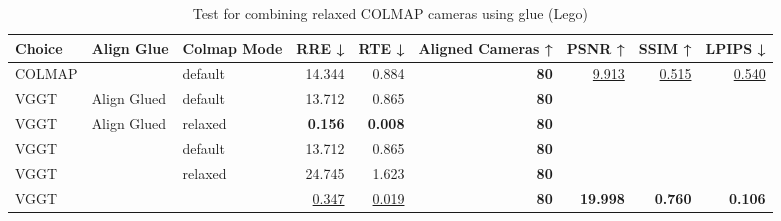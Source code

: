 \begin{table}[H]
\caption{Test for combining relaxed COLMAP cameras using glue (Lego)}
\label{tab:99_align_glue_relaxed_lego}
\begin{tabular}{lllrrrrrr}
\toprule
Choice & Align Glue & Colmap Mode & RRE ↓ & RTE ↓ & Aligned Cameras ↑ & PSNR ↑ & SSIM ↑ & LPIPS ↓ \\
\midrule
COLMAP &  & default & 14.344 & 0.884 & \textbf{80} & \underline{9.913} & \underline{0.515} & \underline{0.540} \\
VGGT & Align Glued & default & 13.712 & 0.865 & \textbf{80} &  &  &  \\
VGGT & Align Glued & relaxed & \textbf{0.156} & \textbf{0.008} & \textbf{80} &  &  &  \\
VGGT &  & default & 13.712 & 0.865 & \textbf{80} &  &  &  \\
VGGT &  & relaxed & 24.745 & 1.623 & \textbf{80} &  &  &  \\
VGGT &  &  & \underline{0.347} & \underline{0.019} & \textbf{80} & \textbf{19.998} & \textbf{0.760} & \textbf{0.106} \\
\bottomrule
\end{tabular}
\end{table}
